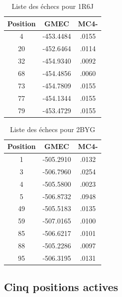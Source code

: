 \documentclass[a4paper,12pt]{article}
\begin{document}
    \begin{table}[h]
      \centering

      \begin{tabular}{|c|c|c|}


        \hline
        Position & GMEC & MC4- \\
        \hline
         4 & -453.4484 & .0155  \\
        20 & -452.6464 & .0114 \\
        32 & -454.9340 & .0092 \\
        68 & -454.4856 & .0060 \\
        73 & -454.7809 & .0155 \\
        77 & -454.1344 & .0155 \\
        79 & -453.4729 & .0155 \\
        
        \hline


      \end{tabular}      
      \caption{Liste des échecs pour 1R6J }
      \label{tab_echec1R6J__1}      
    \end{table}


    \begin{table}[h]
      \centering

      \begin{tabular}{|c|c|c|}

        \hline
        Position & GMEC & MC4- \\
        \hline
        1 & -505.2910 & .0132 \\
        3 & -506.7960 & .0254 \\
        4 & -505.5800 & .0023 \\
        5 & -506.8732 & .0948 \\
        49 & -505.5183 & .0135 \\
        59 & -507.0165 & .0100 \\
        85 & -506.6217 & .0101 \\
        88 & -505.2286 & .0097 \\
        95 & -506.3195 & .0131 \\

        \hline


      \end{tabular}      
      \caption{Liste des échecs pour 2BYG }
      \label{tab_echec2BYG__1}      
    \end{table}


   \subsection{ Cinq positions actives}
\end{document}
